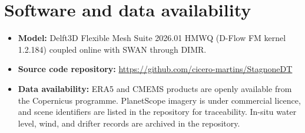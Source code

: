 \documentclass[review,12pt,authoryear]{elsarticle}
\begin{document}
\section*{Software and data availability}
\begin{itemize}
  \item \textbf{Model:} Delft3D Flexible Mesh Suite 2026.01 HMWQ (D-Flow FM
  kernel 1.2.184) coupled online with SWAN through DIMR.
  \item \textbf{Source code repository:} \url{https://github.com/cicero-martins/StagnoneDT}
  \item \textbf{Data availability:} ERA5 and CMEMS products are openly
  available from the Copernicus programme. PlanetScope imagery is under
  commercial licence, and scene identifiers are listed in the repository for
  traceability. In-situ water level, wind, and drifter records are archived
  in the repository.
\end{itemize}

%



\end{document}
